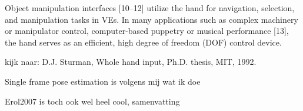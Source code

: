 Object manipulation interfaces [10–12] utilize the hand for navigation, selection, and manipulation tasks in VEs. In many applications such as complex machinery or manipulator control, computer-based puppetry or musical performance [13], the hand serves as an efficient, high degree of freedom (DOF) control device. 

kijk naar: D.J. Sturman, Whole hand input, Ph.D. thesis, MIT, 1992.



Single frame pose estimation is volgens mij wat ik doe



Erol2007 is toch ook wel heel cool, samenvatting